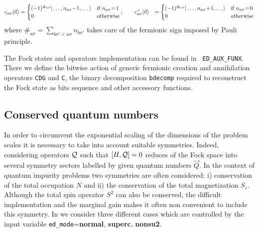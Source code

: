 \documentclass[edipack2.tex]{subfiles}
\begin{document}
\begin{align*}
  c_{a\sigma}\ket{\vec{n}} &=
    \begin{cases}
      (-1)^{\#_{a\sigma}}\ket{\dots,n_{a\sigma}\!-\!1,\dots}
      &\text{if $n_{a\sigma}\!=\! 1$}\\
      0 &\text{otherwise}
    \end{cases};\qquad
    c^{+}_{a\sigma}\ket{\vec{n}} &=
     \begin{cases}
      (-1)^{\#_{a\sigma}}\ket{\dots,n_{a\sigma}\!+\!1,\dots}
      & \text{if $n_{a\sigma}\!=\! 0$}\\
      0 & \text{otherwise}
    \end{cases}    
\end{align*}
where $\#_{a\sigma}=\sum_{b\sigma'<a\sigma} n_{b\sigma'}$ takes care
of the fermionic sign imposed by Pauli principle. 

The Fock states and operators implementation can be found in {\tt
  ED\_AUX\_FUNX}. There we define the bitwise action of generic fermionic creation
and annihilation operators {\tt CDG} and {\tt C}, the binary
decomposition {\tt bdecomp} required to reconstruct the Fock state as
bits sequence and other accessory functions. 

\subsection{Conserved quantum numbers}\label{sSecQNs}
In order to circumvent the exponential scaling of the dimensions of
the problem scales it is necessary to take into account suitable symmetries.
Indeed, considering operators ${\cal Q}$ such that $[H, {\cal Q}]=0$
reduces of the Fock space into several symmetry sectors
labelled by given quantum numbers $\vec{Q}$. 
In the context of quantum impurity problems two symmetries are often considered: i)
conservation of the total occupation $N$ and ii) the
conservation of the total magnetization $S_z$. Although the total spin
operator $S^2$ can also be conserved, the difficult  implementation
and the marginal gain makes it often non convenient to include this symmetry.
In \NAME we consider three different cases which are controlled by the
input variable {\tt ed\_mode}={\bf normal}, {\bf superc}, {\bf
  nonsu2}. 
\end{document}
